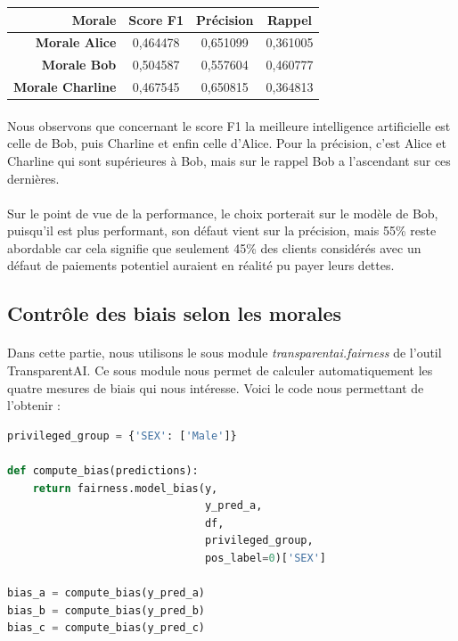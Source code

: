 \documentclass[10pt, french, a4paper]{report}
\begin{document}
\begin{center}
  \begin{tabular}{ |r|c|c|c| } 
    \hline
     Morale & Score F1 & Précision & Rappel  \\
    \hline
    \hline
    \textbf{Morale Alice} & 0,464478 & 0,651099 & 0,361005 \\
    \textbf{Morale Bob} & 0,504587 & 0,557604 & 0,460777 \\
    \textbf{Morale Charline} & 0,467545 & 0,650815 & 0,364813 \\
    \hline
  \end{tabular}
\end{center}

\paragraph{}
Nous observons que concernant le score F1 la meilleure intelligence artificielle est celle de Bob, puis Charline et enfin celle d'Alice. Pour la précision, c'est Alice et Charline qui sont supérieures à Bob, mais sur le rappel Bob a l'ascendant sur ces dernières.

\paragraph{}
Sur le point de vue de la performance, le choix porterait sur le modèle de Bob, puisqu'il est plus performant, son défaut vient sur la précision, mais 55\% reste abordable car cela signifie que seulement 45\% des clients considérés avec un défaut de paiements potentiel auraient en réalité pu payer leurs dettes. 

\subsection{Contrôle des biais selon les morales}

\paragraph{}
Dans cette partie, nous utilisons le sous module \textit{transparentai.fairness} de l'outil TransparentAI. Ce sous module nous permet de calculer automatiquement les quatre mesures de biais qui nous intéresse. Voici le code nous permettant de l'obtenir :

\begin{lstlisting}[language=python]
privileged_group = {'SEX': ['Male']}

def compute_bias(predictions):
    return fairness.model_bias(y, 
                               y_pred_a, 
                               df, 
                               privileged_group, 
                               pos_label=0)['SEX'] 

bias_a = compute_bias(y_pred_a)
bias_b = compute_bias(y_pred_b)
bias_c = compute_bias(y_pred_c)
\end{lstlisting}
  
\end{document}
